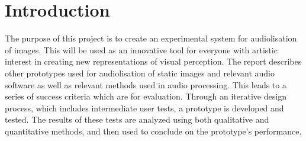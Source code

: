 \chapter{Introduction}\label{ch:introduction}

The purpose of this project is to create an experimental system for audiolisation of images. This will be used as an innovative tool for everyone with artistic interest in creating new representations of visual perception. The report describes other prototypes used for audiolisation of static images and relevant audio software as well as relevant methods used in audio processing. This leads to a series of success criteria which are for evaluation. Through an iterative design process, which includes intermediate user tests, a prototype is developed and tested. The results of these tests are analyzed using both qualitative and quantitative methods, and then used to conclude on the prototype's performance. 
